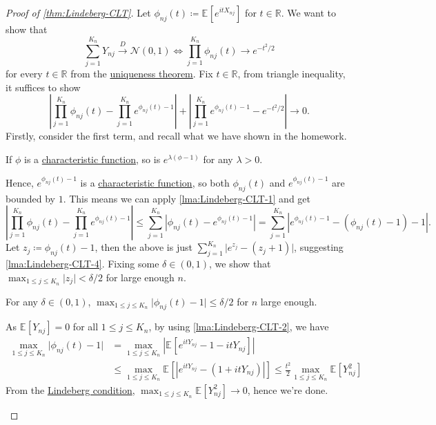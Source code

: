 \begin{proof}[Proof of \autoref{thm:Lindeberg-CLT}]
	Let \(\phi _{nj}(t) \coloneqq \mathbb{E}_{}[e^{it X_{nj}}] \) for \(t \in \mathbb{R} \). We want to show that
	\[
		\sum_{j=1}^{K_n} Y_{nj} \overset{D}{\to} \mathcal{N} (0, 1)
		\iff \prod_{j=1}^{K_n} \phi _{nj}(t) \to e^{-t^2 / 2}
	\]
	for every \(t \in \mathbb{R} \) from the \hyperref[thm:characteristic-function-uniqueness]{uniqueness theorem}. Fix \(t \in \mathbb{R} \), from triangle inequality, it suffices to show
	\[
		\left\vert \prod_{j=1}^{K_n} \phi _{nj}(t) - \prod_{j=1}^{K_n} e^{\phi _{nj}(t) - 1} \right\vert
		+ \left\vert \prod_{j=1}^{K_n} e^{\phi _{nj}(t) - 1} - e^{-t^2 / 2} \right\vert
		\to 0.
	\]
	Firstly, consider the first term, and recall what we have shown in the homework.

	\begin{prev}
		If \(\phi \) is a \hyperref[def:characteristic-function]{characteristic function}, so is \(e^{\lambda (\phi - 1)}\) for any \(\lambda > 0\).
	\end{prev}

	Hence, \(e^{\phi _{nj}(t) - 1}\) is a \hyperref[def:characteristic-function]{characteristic function}, so both \(\phi _{nj}(t)\) and \(e^{\phi _{nj}(t) - 1}\) are bounded by \(1\). This means we can apply \autoref{lma:Lindeberg-CLT-1} and get
	\[
		\left\vert \prod_{j=1}^{K_n} \phi _{nj}(t) - \prod_{j=1}^{K_n} e^{\phi _{nj}(t) - 1} \right\vert
		\leq \sum_{j=1}^{K_n} \left\vert \phi _{nj}(t) - e^{\phi _{nj}(t) - 1} \right\vert
		= \sum_{j=1}^{K_n} \left\vert e^{\phi _{nj}(t) - 1} - (\phi _{nj}(t) - 1) - 1 \right\vert.
	\]
	Let \(z_j \coloneqq \phi _{nj}(t) - 1\), then the above is just \(\sum_{j=1}^{K_n} \vert e^{z_j} - (z_j + 1) \vert \), suggesting \autoref{lma:Lindeberg-CLT-4}. Fixing some \(\delta \in (0, 1)\), we show that \(\max _{1 \leq j \leq K_n} \vert z_j \vert < \delta / 2\) for large enough \(n\).

	\begin{claim}
		For any \(\delta \in (0, 1)\), \(\max _{1 \leq j \leq K_n} \vert \phi _{nj}(t) - 1 \vert \leq \delta / 2\) for \(n\) large enough.
	\end{claim}
	\begin{explanation}
		As \(\mathbb{E}_{}[Y_{nj}] = 0\) for all \(1 \leq j \leq K_n\), by using \autoref{lma:Lindeberg-CLT-2}, we have
		\[
			\begin{split}
				\max _{1 \leq j \leq K_n} \vert \phi _{nj}(t) - 1 \vert
				 & = \max _{1 \leq j \leq K_n} \left\vert \mathbb{E}_{}[e^{i t Y_{nj}} - 1 - i t Y_{nj}]  \right\vert                \\
				 & \leq \max _{1 \leq j \leq K_n} \mathbb{E}_{}\left[\left\vert e^{it Y_{nj}} - (1 + i t Y_{nj}) \right\vert \right]
				\leq \frac{t^2}{2} \max _{1 \leq j \leq K_n} \mathbb{E}_{}[Y_{nj}^2]
			\end{split}
		\]
		From the \hyperref[def:Lindeberg-condition]{Lindeberg condition}, \(\max _{1 \leq j \leq K_n} \mathbb{E}_{}[Y_{nj}^2] \to 0\), hence we're done.
	\end{explanation}


\end{proof}
